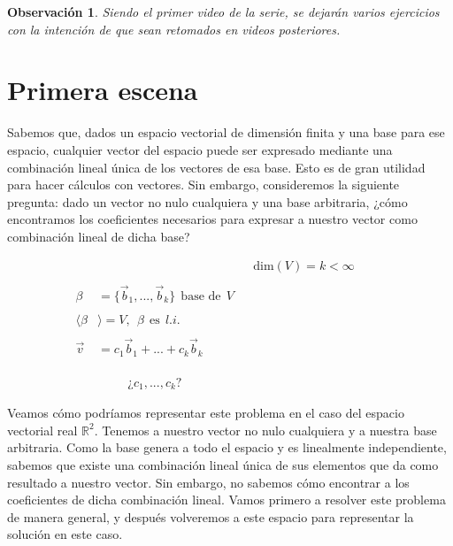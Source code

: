\documentclass[12pt,dvipsnames]{article}
\newtheorem{obs}{Observación}[section]
\numberwithin{equation}{section}
\begin{document}
\begin{obs}
Siendo el primer video de la serie, se dejarán varios ejercicios con la intención de que sean retomados en videos posteriores.
\end{obs}


\newpage
\section{Primera escena}

Sabemos que, dados un espacio vectorial de dimensión finita y una base para ese espacio, cualquier vector del espacio puede ser expresado mediante una combinación lineal única de los vectores de esa base. Esto es de gran utilidad para hacer cálculos con vectores. Sin embargo, consideremos la siguiente pregunta: dado un vector no nulo cualquiera y una base arbitraria, ¿cómo encontramos los coeficientes necesarios para expresar a nuestro vector como combinación lineal de dicha base?

\begin{align*}
    & & &\text{dim}(V)=k<\infty& & &\\
    \\
    \beta&=\{\vec{b}_1,...,\vec{b}_k\} \ \ \text{base de} \ \ V& & & & &\\
    \\
    \langle\beta&\rangle = V, \ \ \beta \ \ \text{es} \ \ l.i.& & & & & \\
    \\
    \vec{v}&= c_1\vec{b}_1 + ... + c_k\vec{b}_k& & & & & \\
    \\
    \\
    \\
    & \quad \quad \ \ \text{¿}c_1,...,c_k\text{?} & & & & &
\end{align*}

Veamos cómo podríamos representar este problema en el caso del espacio vectorial real $\mathbb{R}^2$. Tenemos a nuestro vector no nulo cualquiera y a nuestra base arbitraria. Como la base genera a todo el espacio y es linealmente independiente, sabemos que existe una combinación lineal única de sus elementos que da como resultado a nuestro vector. Sin embargo, no sabemos cómo encontrar a los coeficientes de dicha combinación lineal. Vamos primero a resolver este problema de manera general, y después volveremos a este espacio para representar la solución en este caso.
\end{document}
